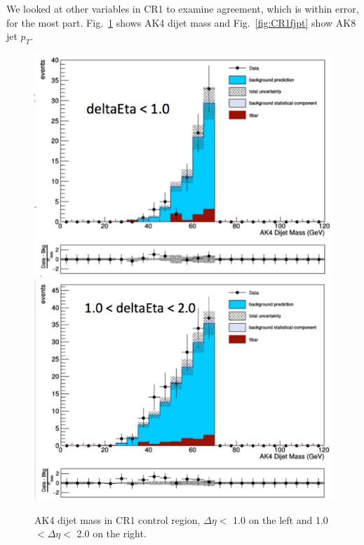 We looked at other variables in CR1 to examine agreement, which is within error, for the most part. Fig.~\ref{fig:CR1djm} shows AK4 dijet mass and Fig.~\ref{fig:CR1fjpt} show AK8 jet $p_{T}$.
\begin{figure}[thb!]
\begin{center}
\includegraphics[scale=0.25]{Figures/CR1DJMdeta0.pdf}
\includegraphics[scale=0.25]{Figures/CR1DJMdeta1.pdf}
\end{center}
\caption{AK4 dijet mass in CR1 control region, $\Delta \eta <$ 1.0 on the left and 1.0 $ < \Delta \eta <$ 2.0 on the right.}
\label{fig:CR1djm}
\end{figure}
